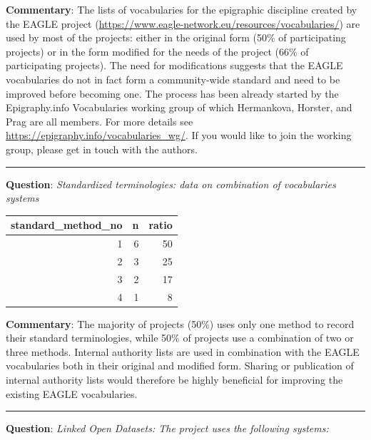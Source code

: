 \documentclass[
  12pt,
]{scrreprt}
\begin{document}
\textbf{Commentary}: The lists of vocabularies for the epigraphic
discipline created by the EAGLE project
(\url{https://www.eagle-network.eu/resources/vocabularies/}) are used by
most of the projects: either in the original form (50\% of participating
projects) or in the form modified for the needs of the project (66\% of
participating projects). The need for modifications suggests that the
EAGLE vocabularies do not in fact form a community-wide standard and
need to be improved before becoming one. The process has been already
started by the Epigraphy.info Vocabularies working group of which
Hermankova, Horster, and Prag are all members. For more details see
\url{https://epigraphy.info/vocabularies_wg/}. If you would like to join
the working group, please get in touch with the authors.

\begin{center}\rule{0.5\linewidth}{0.5pt}\end{center}

\textbf{Question}: \emph{Standardized terminologies: data on combination
of vocabularies systems}

\begin{longtable}[]{@{}rrr@{}}
\toprule
standard\_method\_no & n & ratio \\
\midrule
\endhead
1 & 6 & 50 \\
2 & 3 & 25 \\
3 & 2 & 17 \\
4 & 1 & 8 \\
\bottomrule
\end{longtable}

\textbf{Commentary}: The majority of projects (50\%) uses only one
method to record their standard terminologies, while 50\% of projects
use a combination of two or three methods. Internal authority lists are
used in combination with the EAGLE vocabularies both in their original
and modified form. Sharing or publication of internal authority lists
would therefore be highly beneficial for improving the existing EAGLE
vocabularies.

\begin{center}\rule{0.5\linewidth}{0.5pt}\end{center}

\textbf{Question}: \emph{Linked Open Datasets: The project uses the
following systems:}
\end{document}
